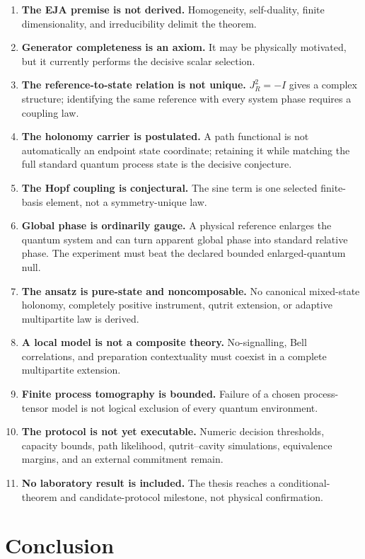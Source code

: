 \documentclass[10pt]{article}
\theoremstyle{definition}
\theoremstyle{remark}
\begin{document}
\begin{enumerate}
\item \textbf{The EJA premise is not derived.} Homogeneity, self-duality, finite dimensionality, and irreducibility delimit the theorem.
\item \textbf{Generator completeness is an axiom.} It may be physically motivated, but it currently performs the decisive scalar selection.
\item \textbf{The reference-to-state relation is not unique.} \(J_R^2=-I\) gives a complex structure; identifying the same reference with every system phase requires a coupling law.
\item \textbf{The holonomy carrier is postulated.} A path functional is not automatically an endpoint state coordinate; retaining it while matching the full standard quantum process state is the decisive conjecture.
\item \textbf{The Hopf coupling is conjectural.} The sine term is one selected finite-basis element, not a symmetry-unique law.
\item \textbf{Global phase is ordinarily gauge.} A physical reference enlarges the quantum system and can turn apparent global phase into standard relative phase. The experiment must beat the declared bounded enlarged-quantum null.
\item \textbf{The ansatz is pure-state and noncomposable.} No canonical mixed-state holonomy, completely positive instrument, qutrit extension, or adaptive multipartite law is derived.
\item \textbf{A local model is not a composite theory.} No-signalling, Bell correlations, and preparation contextuality must coexist in a complete multipartite extension.
\item \textbf{Finite process tomography is bounded.} Failure of a chosen process-tensor model is not logical exclusion of every quantum environment.
\item \textbf{The protocol is not yet executable.} Numeric decision thresholds, capacity bounds, path likelihood, qutrit--cavity simulations, equivalence margins, and an external commitment remain.
\item \textbf{No laboratory result is included.} The thesis reaches a conditional-theorem and candidate-protocol milestone, not physical confirmation.
\end{enumerate}

\section{Conclusion}
\end{document}
